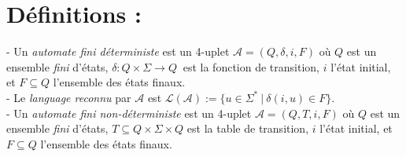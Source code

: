 \documentclass[11pt,a4paper]{article}
\begin{document}
\section{Définitions :}
- Un \textit{automate fini déterministe} est un 4-uplet $\mathcal{A} = (Q,\delta, i, F)$ où $Q$ est un ensemble \textit{fini} d'états, $\delta : Q \times \Sigma \to Q \ $ est la fonction de transition, $i$ l'état initial, et $F \subseteq Q$ l'ensemble des états finaux. \\

- Le \textit{language reconnu} par $\mathcal{A}$ est $\mathcal{L}(\mathcal{A}) := \{u \in \Sigma^* \ | \ \delta(i,u) \in F\}$. \\

- Un \textit{automate fini non-déterministe} est un 4-uplet $\mathcal{A} = (Q,T, i, F)$ où $Q$ est un ensemble \textit{fini} d'états, $ T \subseteq Q \times \Sigma	\times Q$ est la table de transition, $i$ l'état initial, et $F \subseteq Q$ l'ensemble des états finaux. \\
\end{document}
